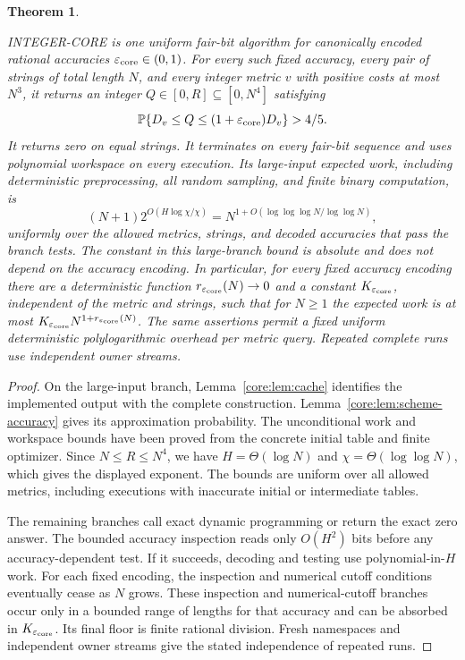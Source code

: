 \documentclass[11pt]{article}
\newtheorem{theorem}{Theorem}[section]
\theoremstyle{definition}
\newcommand{\Prb}{\mathbb P}
\newcommand{\1}{\mathbf 1}
\begin{document}
\FloatBarrier

\begin{theorem}\label{integer:thm:scheme}

INTEGER-CORE is one uniform fair-bit algorithm for canonically encoded
rational accuracies $\varepsilon_{\rm core}\in(0,1)$.
For every such fixed accuracy, every pair of strings of total length
$N$, and every integer metric $v$ with positive costs at most $N^3$,
it returns an integer $Q\in[0,R]\subseteq[0,N^4]$ satisfying
\[
 \Prb\{D_v\le Q\le(1+\varepsilon_{\rm core})D_v\}>4/5.
\]
It returns zero on equal strings.
It terminates on every fair-bit sequence and uses polynomial workspace
on every execution.
Its large-input expected work, including deterministic preprocessing,
all random sampling, and finite binary computation, is
\[
 (N+1)2^{O(H\log\chi/\chi)}
 =N^{1+O(\log\log\log N/\log\log N)},
\]
uniformly over the allowed metrics, strings, and decoded accuracies
that pass the branch tests. The constant in this large-branch bound is
absolute and does not depend on the accuracy encoding.
In particular, for every fixed accuracy encoding there are a deterministic
function $r_{\varepsilon_{\rm core}}(N)\to0$ and a constant
$K_{\varepsilon_{\rm core}}$, independent of the metric and strings, such
that for $N\ge1$ the expected work is at most
$K_{\varepsilon_{\rm core}}N^{1+r_{\varepsilon_{\rm core}}(N)}$.
The same assertions permit a fixed uniform deterministic polylogarithmic
overhead per metric query.
Repeated complete runs use independent owner streams.
\end{theorem}
\begin{proof}
On the large-input branch, Lemma~\ref{core:lem:cache} identifies the
implemented output with the complete construction.
Lemma~\ref{core:lem:scheme-accuracy} gives its approximation probability.
The unconditional work and workspace bounds have been proved from the
concrete initial table and finite optimizer.
Since $N\le R\le N^4$, we have $H=\Theta(\log N)$ and
$\chi=\Theta(\log\log N)$, which gives the displayed exponent.
The bounds are uniform over all allowed metrics, including executions
with inaccurate initial or intermediate tables.

The remaining branches call exact dynamic programming or return the
exact zero answer. The bounded accuracy inspection reads only
$O(H^2)$ bits before any accuracy-dependent test.
If it succeeds, decoding and testing use polynomial-in-$H$ work.
For each fixed encoding, the inspection and numerical cutoff conditions
eventually cease as $N$ grows.
These inspection and numerical-cutoff branches occur only in a bounded
range of lengths for that accuracy and can be absorbed in
$K_{\varepsilon_{\rm core}}$.
Its final floor is finite rational division.
Fresh namespaces and independent owner streams give the stated
independence of repeated runs.
\end{proof}
\end{document}

